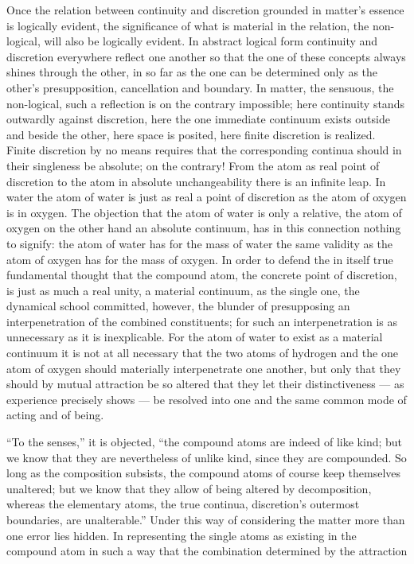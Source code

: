 \documentclass[12pt,a4paper]{book}
\begin{document}
Once the relation between continuity and discretion grounded in matter's
essence is logically evident, the significance of what is material in the
relation, the non-logical, will also be logically evident. In abstract logical
form continuity and discretion everywhere reflect one another so that the one
of these concepts always shines through the other, in so far as the one can be
determined only as the other's presupposition, cancellation and boundary. In
matter, the sensuous, the non-logical, such a reflection is on the contrary
impossible; here continuity stands outwardly against discretion, here the one
immediate continuum exists outside and beside the other, here space is posited,
here finite discretion is realized. Finite discretion by no means requires that
the corresponding continua should in their singleness be absolute; on the
contrary! From the atom as real point of discretion to the atom in absolute
unchangeability there is an infinite leap. In water the atom of water is just
as real a point of discretion as the atom of oxygen is in oxygen. The objection
that the atom of water is only a relative, the atom of oxygen on the other hand
an absolute continuum, has in this connection nothing to signify: the atom of
water has for the mass of water the same validity as the atom of oxygen has for
the mass of oxygen. In order to defend the in itself true fundamental thought
that the compound atom, the concrete point of discretion, is just as much a
real unity, a material continuum, as the single one, the dynamical school
committed, however, the blunder of presupposing an interpenetration of the
combined constituents; for such an interpenetration is as unnecessary as it is
inexplicable. For the atom of water to exist as a material continuum it is not
at all necessary that the two atoms of hydrogen and the one atom of oxygen
should materially interpenetrate one another, but only that they should by
mutual attraction be so altered that they let their distinctiveness --- as
experience precisely shows --- be resolved into one and the same common mode of
acting and of being.

``To the senses,'' it is objected, ``the compound atoms are indeed of like
kind; but we know that they are nevertheless of unlike kind, since they are
compounded. So long as the composition subsists, the compound atoms of course
keep themselves unaltered; but we know that they allow of being altered by
decomposition, whereas the elementary atoms, the true continua, discretion's
outermost boundaries, are unalterable.'' Under this way of considering the
matter more than one error lies hidden. In representing the single atoms as
existing in the compound atom in such a way that the combination determined by
the attraction
\end{document}

